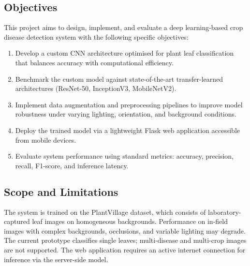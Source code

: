 \subsection{Objectives}

This project aims to design, implement, and evaluate a deep learning-based
crop disease detection system with the following specific objectives:

\begin{enumerate}[label=\textbf{O\arabic*}, leftmargin=2.5em, itemsep=4pt]
  \item Develop a custom CNN architecture optimised for plant leaf
        classification that balances accuracy with computational efficiency.
  \item Benchmark the custom model against state-of-the-art transfer-learned
        architectures (ResNet-50, InceptionV3, MobileNetV2).
  \item Implement data augmentation and preprocessing pipelines to improve
        model robustness under varying lighting, orientation, and
        background conditions.
  \item Deploy the trained model via a lightweight Flask web application
        accessible from mobile devices.
  \item Evaluate system performance using standard metrics: accuracy,
        precision, recall, F1-score, and inference latency.
\end{enumerate}

\subsection{Scope and Limitations}

The system is trained on the PlantVillage dataset, which consists of
laboratory-captured leaf images on homogeneous backgrounds. Performance on
in-field images with complex backgrounds, occlusions, and variable lighting
may degrade. The current prototype classifies single leaves; multi-disease
and multi-crop images are not supported. The web application requires an
active internet connection for inference via the server-side model.

